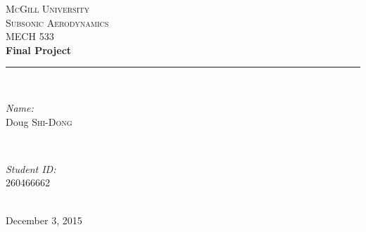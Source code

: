 \documentclass[letterpaper,12pt,]{article}
\begin{document}
\begin{titlepage}

\newcommand{\HRule}{\rule{\linewidth}{0.5mm}} %

\center %
 


\textsc{\LARGE McGill University}\\[3.5cm]
\textsc{\Large Subsonic Aerodynamics}\\[0.5cm] 
\textsc{\large MECH 533}\\[2.5cm]


{ \huge \bfseries Final Project}\\[1.5cm] %

\HRule \\[0.4cm]

\begin{minipage}{0.4\textwidth}
\begin{flushleft} \large
\emph{Name:}\\
Doug \textsc{Shi-Dong} %
\end{flushleft}
\end{minipage}
~
\begin{minipage}{0.4\textwidth}
\begin{flushright} \large
\emph{Student ID:} \\
260466662\\
\end{flushright}
\end{minipage}\\[4cm]

\vfill{}
{\large December 3, 2015}\\[2cm]

\end{titlepage}

\newcommand{\rn}{Reynolds-number}
\end{document}
